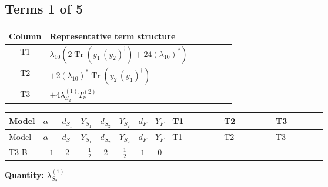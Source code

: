 \documentclass[8pt]{article}
\begin{document}
\begin{landscape}
\subsection*{Terms 1 of 5}
\begin{center}
\begin{tabular}{@{}c >{\raggedright\arraybackslash}p{0.82\linewidth}@{}}
\toprule
Column & Representative term structure \\
\midrule
T1 & \(\displaystyle {\lambda_{10}} (2 \operatorname{Tr}\!\left({y_1}\,\left({y_2}\right)^{\dagger}\right)+24 \left({\lambda_{10}}\right)^{*})\) \\
\midrule
T2 & \(\displaystyle +2 \left({\lambda_{10}}\right)^{*} \operatorname{Tr}\!\left({y_2}\,\left({y_1}\right)^{\dagger}\right)\) \\
\midrule
T3 & \(\displaystyle +4 {\lambda_{S_2}^{(1)}} T_{\nu}^{(2)}\) \\
\midrule
\bottomrule
\end{tabular}
\end{center}
\smallskip
\tiny
\begin{longtable}{@{}llcccccc >{\raggedright\arraybackslash}p{0.21\linewidth} >{\raggedright\arraybackslash}p{0.21\linewidth} >{\raggedright\arraybackslash}p{0.21\linewidth}@{}}
\toprule
Model & $\alpha$ & $d_{S_1}$ & $Y_{S_1}$ & $d_{S_2}$ & $Y_{S_2}$ & $d_F$ & $Y_F$ & T1 & T2 & T3 \\
\midrule
\endfirsthead
\toprule
Model & $\alpha$ & $d_{S_1}$ & $Y_{S_1}$ & $d_{S_2}$ & $Y_{S_2}$ & $d_F$ & $Y_F$ & T1 & T2 & T3 \\
\midrule
\endhead
T3-B & $-1$ & $2$ & $-\frac{1}{2}$ & $2$ & $\frac{1}{2}$ & $1$ & $0$ & \scriptsize\adjustbox{max width=\linewidth}{$\begin{gathered} {\lambda_{10}} (2 \operatorname{Tr}\!\left({y_1}\,\left({y_2}\right)^{\dagger}\right)+24 \left({\lambda_{10}}\right)^{*})\end{gathered}$} & \scriptsize\adjustbox{max width=\linewidth}{$\begin{gathered} +2 \left({\lambda_{10}}\right)^{*} \operatorname{Tr}\!\left({y_2}\,\left({y_1}\right)^{\dagger}\right)\end{gathered}$} & \scriptsize\adjustbox{max width=\linewidth}{$\begin{gathered} +4 {\lambda_{S_2}^{(1)}} T_{\nu}^{(2)}\end{gathered}$} \\
\midrule
\bottomrule
\end{longtable}
\clearpage
\noindent\textbf{Quantity: }$\lambda_{S_2}^{(1)}$\par\smallskip

\end{landscape}
\end{document}

